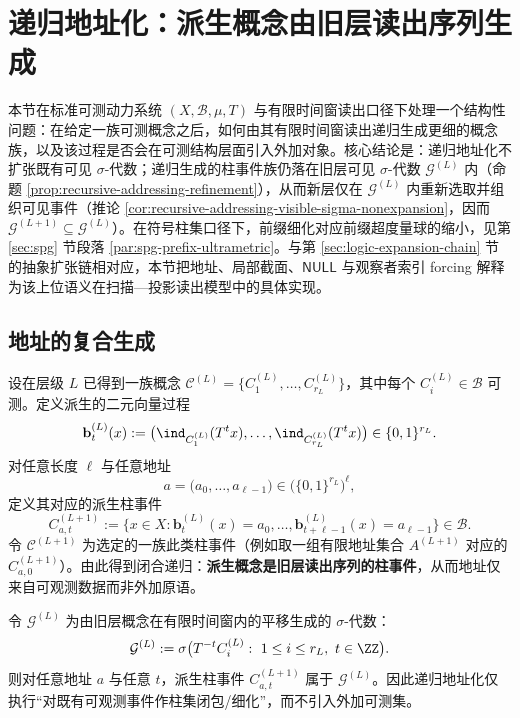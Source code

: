 \section{递归地址化：派生概念由旧层读出序列生成}\label{sec:recursive-addressing}

本节在标准可测动力系统 \((X,\mathcal{B},\mu,T)\) 与有限时间窗读出口径下处理一个结构性问题：在给定一族可测概念之后，如何由其有限时间窗读出递归生成更细的概念族，以及该过程是否会在可测结构层面引入外加对象。核心结论是：递归地址化不扩张既有可见 \(\sigma\)-代数；递归生成的柱事件族仍落在旧层可见 \(\sigma\)-代数 \(\mathcal{G}^{(L)}\) 内（命题 \ref{prop:recursive-addressing-refinement}），从而新层仅在 \(\mathcal{G}^{(L)}\) 内重新选取并组织可见事件（推论 \ref{cor:recursive-addressing-visible-sigma-nonexpansion}，因而 \(\mathcal{G}^{(L+1)}\subseteq \mathcal{G}^{(L)}\)）。在符号柱集口径下，前缀细化对应前缀超度量球的缩小，见第 \ref{sec:spg} 节段落 \ref{par:spg-prefix-ultrametric}。与第 \ref{sec:logic-expansion-chain} 节的抽象扩张链相对应，本节把地址、局部截面、\(\mathsf{NULL}\) 与观察者索引 forcing 解释为该上位语义在扫描—投影读出模型中的具体实现。

\subsection{地址的复合生成}

设在层级 $L$ 已得到一族概念 $\mathcal{C}^{(L)}=\{C^{(L)}_1,\dots,C^{(L)}_{r_L}\}$，其中每个 $C^{(L)}_i\in\mathcal{B}$ 可测。定义派生的二元向量过程
\[
\mathbf{b}^{(L)}_t(x):=\bigl(\ind_{C^{(L)}_1}(T^t x),\dots,\ind_{C^{(L)}_{r_L}}(T^t x)\bigr)\in\{0,1\}^{r_L}.
\]
对任意长度 $\ell$ 与任意地址
\[
a=\bigl(a_0,\dots,a_{\ell-1}\bigr)\in\bigl(\{0,1\}^{r_L}\bigr)^\ell,
\]
定义其对应的派生柱事件
\[
C^{(L+1)}_{a,t}:=\{x\in X:\mathbf{b}^{(L)}_t(x)=a_0,\dots,\mathbf{b}^{(L)}_{t+\ell-1}(x)=a_{\ell-1}\}\in\mathcal{B}.
\]
令 $\mathcal{C}^{(L+1)}$ 为选定的一族此类柱事件（例如取一组有限地址集合 $A^{(L+1)}$ 对应的 $C^{(L+1)}_{a,0}$）。由此得到闭合递归：\textbf{派生概念是旧层读出序列的柱事件}，从而地址仅来自可观测数据而非外加原语。

\begin{proposition}\label{prop:recursive-addressing-refinement}
令 $\mathcal{G}^{(L)}$ 为由旧层概念在有限时间窗内的平移生成的 $\sigma$-代数：
\[
\mathcal{G}^{(L)}:=\sigma\bigl(T^{-t}C_i^{(L)}:\ 1\le i\le r_L,\ t\in\ZZ\bigr).
\]
则对任意地址 $a$ 与任意 $t$，派生柱事件 $C^{(L+1)}_{a,t}$ 属于 $\mathcal{G}^{(L)}$。因此递归地址化仅执行“对既有可观测事件作柱集闭包/细化”，而不引入外加可测集。
\end{proposition}

